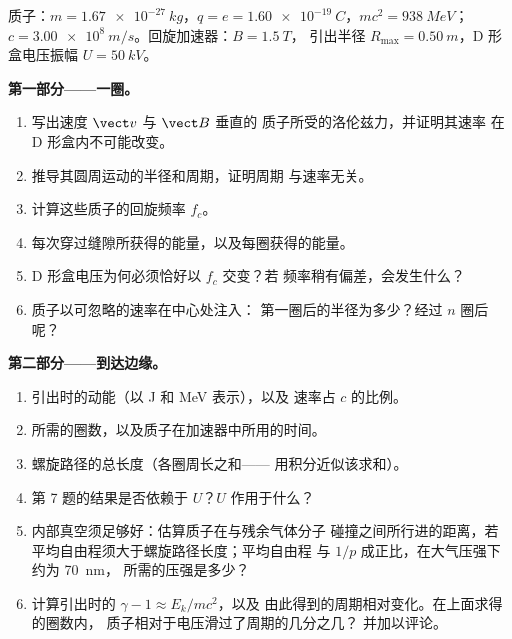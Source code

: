 \begin{problem}
\label{pb:b1:charged-particles:1}
质子：$m = \qty{1.67e-27}{kg}$，$q = e = \qty{1.60e-19}{C}$，$mc^2 =
\qty{938}{MeV}$；$c = \qty{3.00e8}{m/s}$。回旋加速器：$B = \qty{1.5}{T}$，
引出半径 $R_{\max} = \qty{0.50}{m}$，D 形盒电压振幅
$U = \qty{50}{kV}$。

\medskip
\noindent\textbf{第一部分——一圈。}
\begin{enumerate}
  \item 写出速度 $\vect v$ 与 $\vect B$ 垂直的
        质子所受的洛伦兹力，并证明其速率
        在 D 形盒内不可能改变。
  \item 推导其圆周运动的半径和周期，证明周期
        与速率无关。
  \item 计算这些质子的回旋频率 $f_c$。
  \item 每次穿过缝隙所获得的能量，以及每圈获得的能量。
  \item D 形盒电压为何必须恰好以 $f_c$ 交变？若
        频率稍有偏差，会发生什么？
  \item 质子以可忽略的速率在中心处注入：
        第一圈后的半径为多少？经过 $n$ 圈后呢？
\end{enumerate}

\medskip
\noindent\textbf{第二部分——到达边缘。}
\begin{enumerate}[resume]
  \item 引出时的动能（以 J 和 MeV 表示），以及
        速率占 $c$ 的比例。
  \item 所需的圈数，以及质子在加速器中所用的时间。
  \item 螺旋路径的总长度（各圈周长之和——
        用积分近似该求和）。
  \item 第 7 题的结果是否依赖于 $U$？$U$
        作用于什么？
  \item 内部真空须足够好：估算质子在与残余气体分子
        碰撞之间所行进的距离，若
        平均自由程须大于螺旋路径长度；平均自由程
        与 $1/p$ 成正比，在大气压强下约为 \qty{70}{nm}，
        所需的压强是多少？
  \item 计算引出时的 $\gamma - 1 \approx E_k/mc^2$，以及
        由此得到的周期相对变化。在上面求得的圈数内，
        质子相对于电压滑过了周期的几分之几？
        并加以评论。
\end{enumerate}


\end{problem}
